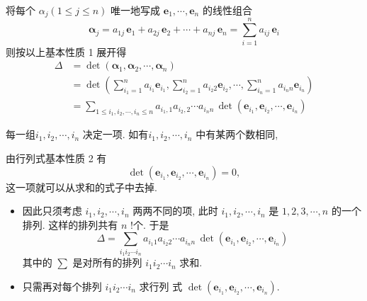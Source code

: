 \documentclass[10pt,punct]{ctexbeamer}
\begin{document}
    \begin{frame}
        将每个 $\alpha_j(1 \leqslant j \leqslant n)$ 唯一地写成 $\boldsymbol{e}_1, \cdots, \boldsymbol{e}_n$ 的线性组合
        $$
        \boldsymbol{\alpha}_j
        =a_{1 j} \, \boldsymbol{e}_1
        +a_{2 j} \, \boldsymbol{e}_2
        +\cdots+a_{n j} \, \boldsymbol{e}_n
        =\sum_{i=1}^n a_{i j} \, \boldsymbol{e}_i
        $$
        则按以上基本性质 1 展开得
        $$
        \begin{aligned}
            \Delta &=\operatorname{det}\left(\boldsymbol{\alpha}_1, \boldsymbol{\alpha}_2, \cdots, \boldsymbol{\alpha}_n\right) \\
            &=\operatorname{det}\left(\sum_{i_1=1}^n a_{i_1} \boldsymbol{e}_{i_1}, \sum_{i_2=1}^n a_{i_2 2} \boldsymbol{e}_{i_2}, \cdots, \sum_{i_n=1}^n a_{i_n n} \boldsymbol{e}_{i_n}\right) \\
            &=\sum_{1 \leqslant i_1, i_2, \cdots, i_n \leqslant n} a_{i_1, 1} a_{i_2, 2} \cdots a_{i_n n} \, \operatorname{det}\left(\boldsymbol{e}_{i_1}, \boldsymbol{e}_{i_2}, \cdots, \boldsymbol{e}_{i_n}\right)
        \end{aligned}
        $$

        每一组$i_1, i_2, \cdots, i_n$ 决定一项.
        如有$i_1, i_2, \cdots, i_n$ 中有某两个数相同,

        由行列式基本性质 2 有 $$\operatorname{det}\left(\boldsymbol{e}_{i_1}, \boldsymbol{e}_{i_2}, \cdots, \boldsymbol{e}_{i_n}\right)=0,$$
        这一项就可以从求和的式子中去掉.
    \end{frame}







    \begin{frame}
        \begin{itemize}
            \item   因此只须考虑 $i_1, i_2, \cdots, i_n$ 两两不同的项, 此时 $i_1, i_2, \cdots, i_n$ 是 $1,2,3, \cdots, n$ 的一个排列. 这样的排列共有 $n$ !个. 于是
            $$
            \Delta=\sum_{i_1 i_2 \cdots i_n} a_{i_1 1} a_{i_2  2} \cdots a_{i_n n} \, \operatorname{det}\left(\boldsymbol{e}_{i_1}, \boldsymbol{e}_{i_2}, \cdots, \boldsymbol{e}_{i_n}\right)
            $$
            其中的 $\sum$ 是对所有的排列 $i_1 i_2 \cdots i_n$ 求和.
            \item   只需再对每个排列 $i_1 i_2 \cdots i_n$ 求行列 式 $\operatorname{det}\left(\boldsymbol{e}_{i_1}, \boldsymbol{e}_{i_2}, \cdots, \boldsymbol{e}_{i_n}\right)$.



        \end{itemize}

    \end{frame}
\end{document}
